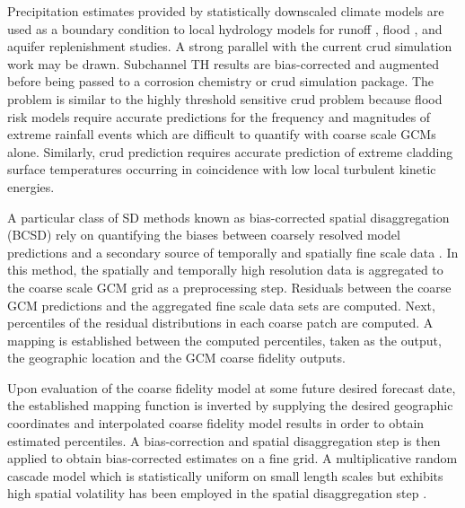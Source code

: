 
Precipitation estimates provided by statistically downscaled climate models are used as a boundary condition to local hydrology models for runoff \cite{wood2002}, flood \cite{hess2007}, and aquifer replenishment studies.  A strong parallel with the current crud simulation work may be drawn. Subchannel TH results are bias-corrected and augmented before being passed to a corrosion chemistry or crud simulation package. The problem is similar to the highly threshold sensitive crud problem because flood risk models require accurate predictions for the frequency and magnitudes of extreme rainfall events which are difficult to quantify with coarse scale GCMs alone.  Similarly, crud prediction requires accurate prediction of extreme cladding surface temperatures occurring in coincidence with low local turbulent kinetic energies.

A particular class of SD methods known as bias-corrected spatial disaggregation (BCSD) rely on quantifying the biases between coarsely resolved model predictions and a secondary source of temporally and spatially fine scale data \cite{wood2002}.  In this method, the spatially and temporally high resolution data is aggregated to the coarse scale GCM grid as a preprocessing step.  Residuals between the coarse GCM predictions and the aggregated fine scale data sets are computed. Next, percentiles of the residual distributions in each coarse patch are computed.  A mapping is established between the computed percentiles, taken as the output, the geographic location and the GCM coarse fidelity outputs.  

Upon evaluation of the coarse fidelity model at some future desired forecast date, the established mapping function is inverted by supplying the desired geographic coordinates and interpolated coarse fidelity model results in order to obtain estimated percentiles.   A bias-correction and spatial disaggregation step is then applied to obtain bias-corrected estimates on a fine grid.  A multiplicative random cascade model which is statistically uniform on small length scales but exhibits high spatial volatility has been employed in the spatial disaggregation step \cite{hess2007}.  

